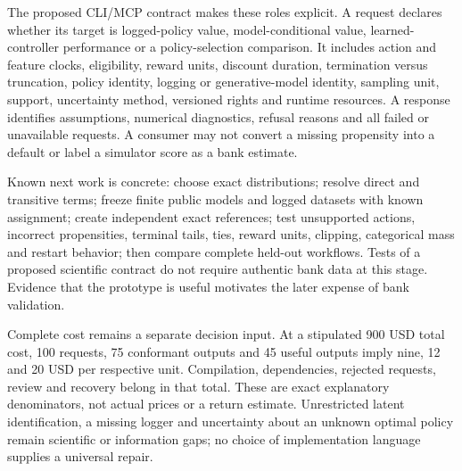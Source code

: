 The proposed CLI/MCP contract makes these roles explicit. A request declares whether its target is logged-policy value, model-conditional value, learned-controller performance or a policy-selection comparison. It includes action and feature clocks, eligibility, reward units, discount duration, termination versus truncation, policy identity, logging or generative-model identity, sampling unit, support, uncertainty method, versioned rights and runtime resources. A response identifies assumptions, numerical diagnostics, refusal reasons and all failed or unavailable requests. A consumer may not convert a missing propensity into a default or label a simulator score as a bank estimate.\citep{exec24_policycxx_comparison}

Known next work is concrete: choose exact distributions; resolve direct and transitive terms; freeze finite public models and logged datasets with known assignment; create independent exact references; test unsupported actions, incorrect propensities, terminal tails, ties, reward units, clipping, categorical mass and restart behavior; then compare complete held-out workflows. Tests of a proposed scientific contract do not require authentic bank data at this stage. Evidence that the prototype is useful motivates the later expense of bank validation.\citep{exec24_policycxx_comparison}

Complete cost remains a separate decision input. At a stipulated 900 USD total cost, 100 requests, 75 conformant outputs and 45 useful outputs imply nine, 12 and 20 USD per respective unit. Compilation, dependencies, rejected requests, review and recovery belong in that total. These are exact explanatory denominators, not actual prices or a return estimate. Unrestricted latent identification, a missing logger and uncertainty about an unknown optimal policy remain scientific or information gaps; no choice of implementation language supplies a universal repair.\citep{exec24_policycxx_comparison}
